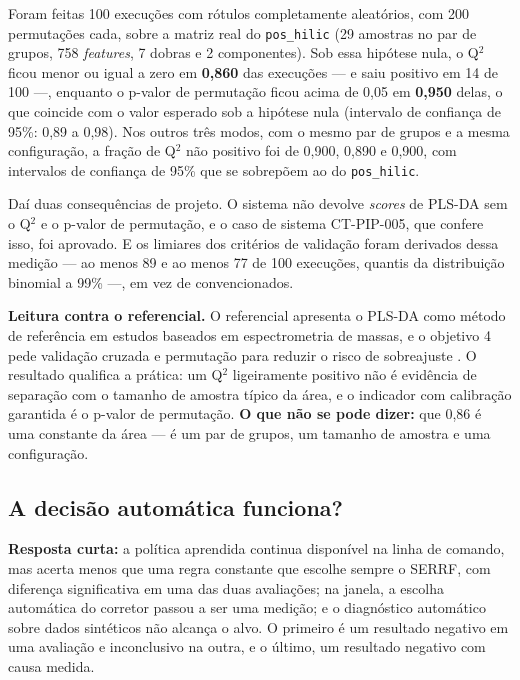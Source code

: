 Foram feitas 100 execuções com rótulos completamente aleatórios, com 200 permutações cada, sobre a matriz real do \texttt{pos\_\allowbreak{}hilic} (29 amostras no par de grupos, 758 \textit{features}, 7 dobras e 2 componentes). Sob essa hipótese nula, o Q$^{2}$ ficou menor ou igual a zero em \textbf{0,860} das execuções --- e saiu positivo em 14 de 100 ---, enquanto o p-valor de permutação ficou acima de 0,05 em \textbf{0,950} delas, o que coincide com o valor esperado sob a hipótese nula (intervalo de confiança de 95\%: 0,89 a 0,98). Nos outros três modos, com o mesmo par de grupos e a mesma configuração, a fração de Q$^{2}$ não positivo foi de 0,900, 0,890 e 0,900, com intervalos de confiança de 95\% que se sobrepõem ao do \texttt{pos\_\allowbreak{}hilic}.

Daí duas consequências de projeto. O sistema não devolve \textit{scores} de PLS-DA sem o Q$^{2}$ e o p-valor de permutação, e o caso de sistema CT-PIP-005, que confere isso, foi aprovado. E os limiares dos critérios de validação foram derivados dessa medição --- ao menos 89 e ao menos 77 de 100 execuções, quantis da distribuição binomial a 99\% ---, em vez de convencionados.


\textbf{Leitura contra o referencial.} O referencial apresenta o PLS-DA como método de referência em estudos baseados em espectrometria de massas, e o objetivo 4 pede validação cruzada e permutação para reduzir o risco de sobreajuste \cite{worley2013multivariate}. O resultado qualifica a prática: um Q$^{2}$ ligeiramente positivo não é evidência de separação com o tamanho de amostra típico da área, e o indicador com calibração garantida é o p-valor de permutação. \textbf{O que não se pode dizer:} que 0,86 é uma constante da área --- é um par de grupos, um tamanho de amostra e uma configuração.

\subsection{A decisão automática funciona?}\label{sec:5-3-4}

\textbf{Resposta curta:} a política aprendida continua disponível na linha de comando, mas acerta menos que uma regra constante que escolhe sempre o SERRF, com diferença significativa em uma das duas avaliações; na janela, a escolha automática do corretor passou a ser uma medição; e o diagnóstico automático sobre dados sintéticos não alcança o alvo. O primeiro é um resultado negativo em uma avaliação e inconclusivo na outra, e o último, um resultado negativo com causa medida.

